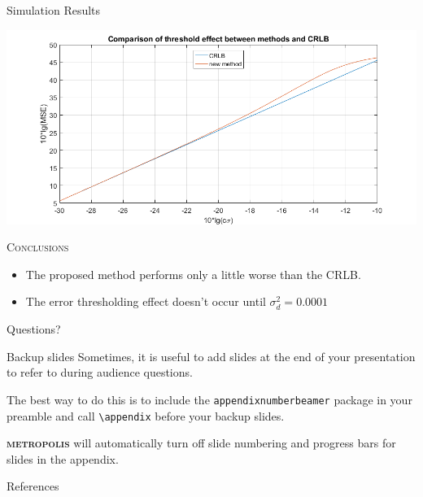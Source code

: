 \documentclass[10pt]{beamer}
\newcommand{\themename}{\textbf{\textsc{metropolis}}\xspace}
\begin{document}
\begin{frame}{Simulation Results}
  \begin{center}
  \includegraphics[scale=0.35]{fig4.JPG}
  \end{center}
  \begin{center} \textsc{Conclusions} \end{center}
  \begin{itemize}
    \item \small The proposed method performs only a little worse than the CRLB.
    \item \small The error thresholding effect doesn't occur until $ \sigma_d^2 = 0.0001 $
  \end{itemize}

\end{frame}








\begin{frame}[standout]
  Questions?
\end{frame}

\appendix

\begin{frame}[fragile]{Backup slides}
  Sometimes, it is useful to add slides at the end of your presentation to
  refer to during audience questions.

  The best way to do this is to include the \verb|appendixnumberbeamer|
  package in your preamble and call \verb|\appendix| before your backup slides.

  \themename will automatically turn off slide numbering and progress bars for
  slides in the appendix.
\end{frame}

\begin{frame}[allowframebreaks]{References}

  
  

\end{frame}
\end{document}
